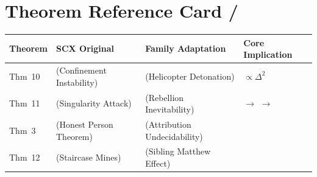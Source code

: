 \documentclass[11pt,a4paper]{article}
\begin{document}
\section{Theorem Reference Card / }

\begin{center}
\begin{tabular}{p{2cm} p{4cm} p{4cm} p{5cm}}
\toprule
\textbf{Theorem} & \textbf{SCX Original} & \textbf{Family Adaptation} & \textbf{Core Implication} \\
\midrule
Thm~10 &  (Confinement Instability) &  (Helicopter Detonation) &  $\propto \Delta^2$ \\
\addlinespace
Thm~11 &  (Singularity Attack) &  (Rebellion Inevitability) &  $\to$  $\to$  \\
\addlinespace
Thm~3 &  (Honest Person Theorem) &  (Attribution Undecidability) &  \\
\addlinespace
Thm~12 &  (Staircase Mines) &  (Sibling Matthew Effect) &  \\
\bottomrule
\end{tabular}
\end{center}
\end{document}
